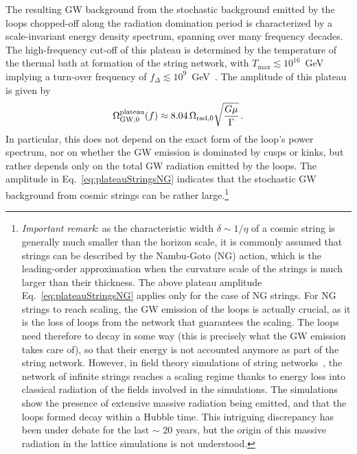 \documentclass[11pt,a4paper]{article}
\begin{document}
The resulting GW background from the stochastic background emitted by the loops chopped-off along the radiation domination period is characterized by a scale-invariant energy density spectrum, spanning over many frequency decades. The high-frequency cut-off of this plateau is determined by the temperature of the thermal bath at formation of the string network, with $T_\text{max} \lesssim 10^{16}$~GeV implying a turn-over frequency of $f_\Delta \lesssim 10^9$~GeV~\cite{Gouttenoire:2019kij}.
The amplitude of this plateau is given by~\cite{Auclair:2019wcv}
\begin{equation}\label{eq:plateauStringsNG}
\mathrm{\Omega}^{\rm plateau}_{\text{GW},0}(f) \approx 8.04\, \Omega_{\text{rad},0} \sqrt{\frac{G\mu}{\mathrm{\Gamma}}}\,.
\end{equation}
In particular, this does not depend on the exact form of the loop's power spectrum, nor on whether the GW emission is dominated by cusps or kinks, but rather depends only on the total GW radiation emitted by the loops. The amplitude in Eq.~\eqref{eq:plateauStringsNG} indicates that the stochastic GW background from cosmic strings can be rather large.\footnote{{\it Important remark}: as the characteristic width $\delta \sim 1/\eta$ of a cosmic string is generally much smaller than the horizon scale, it is commonly assumed that strings can be described by the Nambu-Goto (NG) action, which is the leading-order approximation when the curvature scale of the strings is much larger than their thickness. The above plateau amplitude Eq.~\eqref{eq:plateauStringsNG} applies only for the case of NG strings. For NG strings to reach scaling, the GW emission of the loops is actually crucial, as it is the loss of loops from the network that guarantees the scaling. The loops need therefore to decay in some way (this is precisely what the GW emission takes care of), so that their energy is not accounted anymore as part of the string network. However, in field theory simulations of string networks~\cite{Vincent:1997cx,Hindmarsh:2008dw,Daverio:2015nva,Hindmarsh:2017qff}, the network of infinite strings reaches a scaling regime thanks to energy loss into classical radiation of the fields involved in the simulations. The simulations show the presence of extensive massive radiation being emitted, and that the loops formed decay within a Hubble time. This intriguing discrepancy has been under debate for the last $\sim$ 20 years, but the origin of this massive radiation in the lattice simulations is not understood.}
\end{document}
